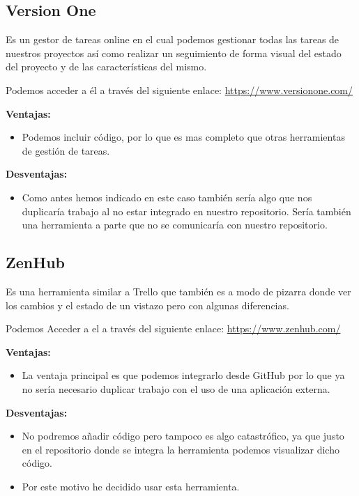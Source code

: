 \subsection{Version One}
Es un gestor de tareas online en el cual podemos gestionar todas las tareas de nuestros proyectos así como realizar un seguimiento de forma visual del estado del proyecto y de las características del mismo.

Podemos acceder a él a través del siguiente enlace: 
\url{https://www.versionone.com/}


\textbf{Ventajas:}

\begin{itemize}
\item Podemos incluir código, por lo que es mas completo que otras herramientas de gestión de tareas.
\end{itemize}

\textbf{Desventajas:}

\begin{itemize}
\item Como antes hemos indicado en este caso también sería algo que nos duplicaría trabajo al no estar integrado en nuestro repositorio. Sería también una herramienta a parte que no se comunicaría con nuestro repositorio.
\end{itemize}


\subsection{ZenHub}
Es una herramienta similar a Trello que también es a modo de pizarra donde ver los cambios y el estado de un vistazo pero con algunas diferencias.

Podemos Acceder a el a través del siguiente enlace: 
\url{https://www.zenhub.com/}



\textbf{Ventajas:}

\begin{itemize}
\item La ventaja principal es que podemos integrarlo desde GitHub por lo que ya no sería necesario duplicar trabajo con el uso de una aplicación externa.
\end{itemize}

\textbf{Desventajas:}

\begin{itemize}
\item No podremos añadir código pero tampoco es algo catastrófico, ya que justo en el repositorio donde se integra la herramienta podemos visualizar dicho código.

\item Por este motivo he decidido usar esta herramienta.
\end{itemize}

